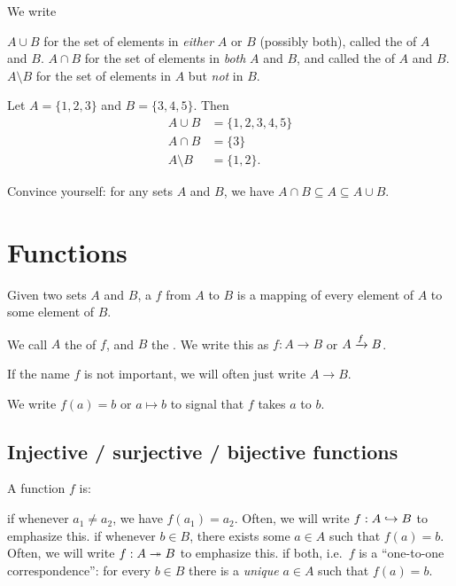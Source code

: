 \begin{definition}
	We write
	\begin{itemize}
		\ii $A \cup B$ for the set of elements in
		\emph{either} $A$ or $B$ (possibly both),
		called the  of $A$ and $B$.
		\ii $A \cap B$ for the set of elements in \emph{both} $A$ and $B$, and
		called the  of $A$ and $B$.
		\ii $A \setminus B$ for the set of elements in $A$ but \emph{not} in $B$.
	\end{itemize}
\end{definition}

\begin{example}
	Let $A = \{1,2,3\}$ and $B = \{3,4,5\}$. Then
	\begin{align*}
		A \cup B &= \{1,2,3,4,5\} \\
		A \cap B &= \{3\} \\
		A \setminus B &= \{1,2\}.
	\end{align*}
\end{example}

\begin{exercise}
	Convince yourself: for any sets $A$ and $B$,
	we have $A \cap B \subseteq A \subseteq A \cup B$.
\end{exercise}

\section{Functions}
Given two sets $A$ and $B$, a  $f$ from $A$ to $B$
is a mapping of every element of $A$ to some element of $B$.

We call $A$ the  of $f$, and $B$ the .
We write this as $f : A \to B$ or $A \xrightarrow{f} B$.
\begin{abuse}
	If the name $f$ is not important, we will often just write $A \to B$.
\end{abuse}
We write $f(a) = b$ or $a \mapsto b$ to signal that $f$ takes $a$ to $b$.

\subsection{Injective / surjective / bijective functions}
\begin{definition}
	A function $f$ is:
	\begin{itemize}
		\ii {} if whenever $a_1 \neq a_2$, we have $f(a_1) = a_2$.
		Often, we will write $f : A \hookrightarrow B$ to emphasize this.
		\ii {} if whenever $b \in B$, there exists some $a \in A$
		such that $f(a) = b$.
		Often, we will write $f : A \twoheadrightarrow B$ to emphasize this.
		\ii {} if both, i.e.\ $f$ is a ``one-to-one correspondence'':
		for every $b \in B$ there is a \emph{unique} $a \in A$
		such that $f(a) = b$.
	\end{itemize}
\end{definition}


